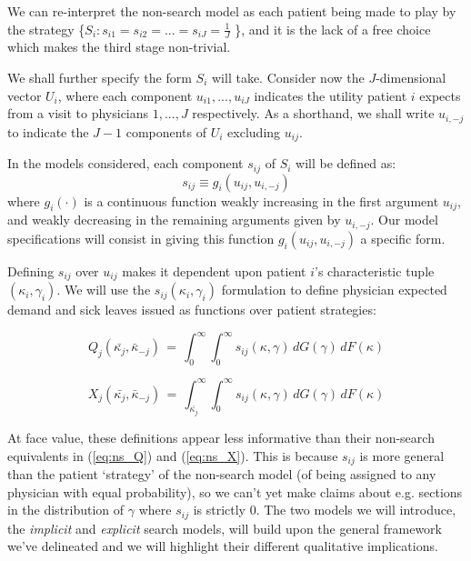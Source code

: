 \documentclass[../main.tex]{subfiles}
\begin{document}
We can re-interpret the non-search model as each patient being made to play by the strategy \{$S_i: s_{i1} = s_{i2} = ... = s_{iJ} = \frac{1}{J}$ \}, and it is the lack of a free choice which makes the third stage non-trivial.

We shall further specify the form $S_i$ will take. Consider now the $J$-dimensional vector $U_i$, where each component $u_{i1}, ... , u_{iJ}$ indicates the utility patient $i$ expects from a visit to physicians $1, ..., J$ respectively. As a shorthand, we shall write $u_{i,-j}$ to indicate the $J - 1$ components of $U_i$ excluding $u_{ij}$.

In the models considered, each component $s_{ij}$ of $S_i$ will be defined as:
\[s_{ij} \equiv g_i(u_{ij}, u_{i,-j})\]
where $g_i(\cdot)$ is a continuous function weakly increasing in the first argument $u_{ij}$, and weakly decreasing in the remaining arguments given by $u_{i,-j}$. Our model specifications will consist in giving this function $g_i(u_{ij}, u_{i,-j})$ a specific form.

Defining $s_{ij}$ over $u_{ij}$ makes it dependent upon patient $i$'s characteristic tuple $(\kappa_i, \gamma_i)$. We will use the $s_{ij}(\kappa_i, \gamma_i)$ formulation to define physician expected demand and sick leaves issued as functions over patient strategies:

\begin{equation}
    Q_j(\bar{\kappa_j}, \bar{\kappa}_{-j}) \,=\, \int_{0}^{\infty} \int_{0}^{\infty}s_{ij}(\kappa, \gamma) \,dG(\gamma) \,dF(\kappa)
    \label{eq:s_Q}
\end{equation}

\begin{equation}
    X_j(\bar{\kappa_j}, \bar{\kappa}_{-j}) \,=\, \int_{\bar{\kappa_j}}^{\infty} \int_{0}^{\infty}s_{ij}(\kappa, \gamma)  \,dG(\gamma) \,dF(\kappa)
    \label{eq:s_X}
\end{equation}

At face value, these definitions appear less informative than their non-search equivalents in (\ref{eq:ns_Q}) and (\ref{eq:ns_X}). This is because $s_{ij}$ is more general than the patient `strategy' of the non-search model (of being assigned to any physician with equal probability), so we can't yet make claims about e.g. sections in the distribution of $\gamma$ where $s_{ij}$ is strictly 0. The two models we will introduce, the \textit{implicit} and \textit{explicit} search models, will build upon the general framework we've delineated and we will highlight their different qualitative implications.
\end{document}
